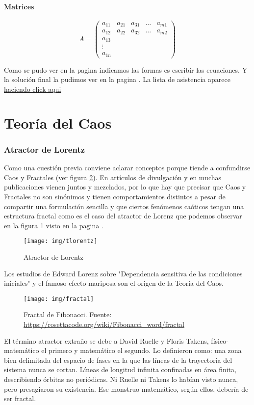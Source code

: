 \documentclass[12pt,a4paper]{article}
\begin{document}
\subsection*{Matrices}
$$A=\begin{pmatrix}
a_{11} & a_{21} & a_{31} & \hdots & a_{m1} \\
a_{12} & a_{22} & a_{32} & \hdots & a_{m2} \\
a_{13} \\
\vdots \\
a_{1n}
\end{pmatrix}$$

Como se pudo ver en la pagina \pageref{formulas} indicamos las formas es escribir las ecuaciones. Y la solución final la pudimos ver en la pagina \pageref{Atmos}. La lista de asistencia aparece \href{https://forms.gle/84VyN2QJq7twTHH87}{haciendo click aqui}

\newpage
\part{Teoría del Caos}
\section{Atractor de Lorentz}
Como una cuestión previa conviene aclarar conceptos porque tiende a confundirse Caos y Fractales (ver figura \ref{img:fibo}). En artículos de divulgación y en muchas publicaciones vienen juntos y mezclados, por lo que hay que precisar que Caos y Fractales no son sinónimos y tienen comportamientos distintos a pesar de compartir una formulación sencilla y que ciertos fenómenos caóticos tengan una estructura fractal como es el caso del atractor de Lorenz que podemos observar en la figura \ref{img-lorentz} visto en la pagina \pageref{img-lorentz}.
\begin{figure}[H]
	\centering
	\texttt{[image: img/tlorentz]}
	\caption{Atractor de Lorentz}
	\label{img-lorentz}
\end{figure}
Los estudios de Edward Lorenz sobre  "Dependencia sensitiva de las condiciones iniciales" y el famoso efecto mariposa son el origen de la Teoría del Caos.
\begin{figure}[H]
	\centering
	\caption{Fractal de Fibonacci. Fuente: \url{https://rosettacode.org/wiki/Fibonacci_word/fractal}}
	\texttt{[image: img/fractal]}
	\label{img:fibo}
\end{figure}
El término atractor extraño se debe a David Ruelle y Floris Takens, físico-matemático el primero y matemático el segundo. Lo definieron como: una zona bien delimitada del espacio de fases en la que las líneas de la trayectoria del sistema nunca se cortan. Líneas de longitud infinita confinadas en área finita, describiendo órbitas no periódicas. Ni Ruelle ni Takens lo habían visto nunca, pero presagiaron su existencia. Ese monstruo matemático, según ellos, debería de ser fractal.
\end{document}

